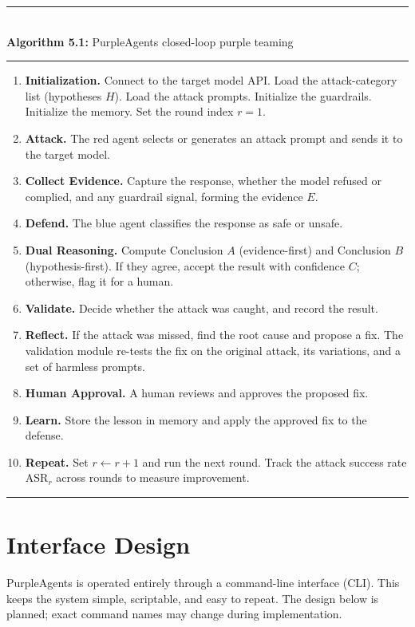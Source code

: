 \medskip
\noindent\rule{\textwidth}{0.6pt}\\
\textbf{Algorithm 5.1:} PurpleAgents closed-loop purple teaming\\[-6pt]
\noindent\rule{\textwidth}{0.4pt}
\begin{enumerate}[label=\textbf{Step \arabic*:}, leftmargin=*, align=left]
  \item \textbf{Initialization.} Connect to the target model API. Load the
  attack-category list (hypotheses $H$). Load the attack prompts. Initialize the
  guardrails. Initialize the memory. Set the round index $r = 1$.
  \item \textbf{Attack.} The red agent selects or generates an attack prompt and
  sends it to the target model.
  \item \textbf{Collect Evidence.} Capture the response, whether the model
  refused or complied, and any guardrail signal, forming the evidence $E$.
  \item \textbf{Defend.} The blue agent classifies the response as safe or
  unsafe.
  \item \textbf{Dual Reasoning.} Compute Conclusion $A$ (evidence-first) and
  Conclusion $B$ (hypothesis-first). If they agree, accept the result with
  confidence $C$; otherwise, flag it for a human.
  \item \textbf{Validate.} Decide whether the attack was caught, and record the
  result.
  \item \textbf{Reflect.} If the attack was missed, find the root cause and
  propose a fix. The validation module re-tests the fix on the original attack,
  its variations, and a set of harmless prompts.
  \item \textbf{Human Approval.} A human reviews and approves the proposed fix.
  \item \textbf{Learn.} Store the lesson in memory and apply the approved fix to
  the defense.
  \item \textbf{Repeat.} Set $r \leftarrow r + 1$ and run the next round. Track the
  attack success rate $\mathrm{ASR}_r$ across rounds to measure improvement.
\end{enumerate}
\noindent\rule{\textwidth}{0.6pt}

\section{Interface Design}

PurpleAgents is operated entirely through a command-line interface (CLI). This
keeps the system simple, scriptable, and easy to repeat. The design below is
planned; exact command names may change during implementation.

